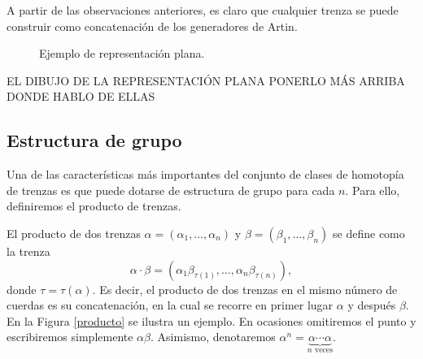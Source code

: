 \documentclass[bibtex, anon]{TEMat-article}
\begin{document}
A partir de las observaciones anteriores, es claro que cualquier trenza se puede construir como concatenación de los generadores de Artin.

\begin{figure}[h!]
	\centering
	\caption{Ejemplo de representación plana.}\label{plana}
\end{figure}
EL DIBUJO DE LA REPRESENTACIÓN PLANA PONERLO MÁS ARRIBA DONDE HABLO DE ELLAS

\subsection{Estructura de grupo}
Una de las características más importantes del conjunto de clases de homotopía de trenzas es que puede dotarse de estructura de grupo para cada $n$. Para ello, definiremos el producto de trenzas. 

\begin{defi}
	El producto de dos trenzas $\alpha=(\alpha_1,\dots, \alpha_n)$ y $\beta=(\beta_1,\dots,\beta_n)$ se define como la trenza
	$$\alpha\cdot\beta = (\alpha_1\beta_{\tau(1)},\dots, \alpha_n\beta_{\tau(n)}),$$
	donde $\tau=\tau(\alpha)$. Es decir, el producto de dos trenzas en el mismo número de cuerdas es su concatenación, en la cual se recorre en primer lugar $\alpha$ y después $\beta$. En la Figura \ref{producto} se ilustra un ejemplo. En ocasiones omitiremos el punto y escribiremos simplemente $\alpha\beta$. Asimismo, denotaremos $\alpha^n=\underbrace{\alpha\cdots\alpha}_{n\text{ veces}}$.
\end{defi}
\end{document}
